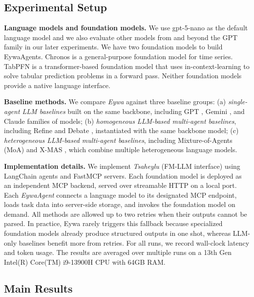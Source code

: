 \documentclass{llmxive}
\begin{document}
{\subsection{Experimental Setup}
\textbf{Language models and foundation models.} We use gpt-5-nano as the default language model and we also evaluate other models from and beyond the GPT family in our later experiments.
We have two foundation models to build EywaAgents. Chronos \cite{DBLP:journals/tmlr/AnsariSTZMSSRPK24, DBLP:journals/corr/abs-2510-15821} is a general-purpose foundation model for time series. 
TabPFN \cite{DBLP:conf/iclr/Hollmann0EH23} is a transformer-based foundation model that uses in-context-learning to solve tabular prediction problems in a forward pass.
Neither foundation models provide a native language interface.


\textbf{Baseline methods.} We compare \textit{Eywa} against three baseline groups: (a) \emph{single-agent LLM baselines} built on the same backbone, including GPT \cite{DBLP:journals/corr/abs-2601-03267}, Gemini \cite{team2023gemini, comanici2025gemini}, and Claude \cite{claude} families of models; (b) \emph{homogeneous LLM-based multi-agent baselines}, including Refine \cite{DBLP:conf/nips/MadaanTGHGW0DPY23} and Debate \cite{DBLP:conf/icml/Du00TM24}, instantiated with the same backbone model; (c) \emph{heterogeneous LLM-based multi-agent baselines}, including Mixture-of-Agents (MoA) \cite{DBLP:conf/iclr/WangWAZZ25} and X-MAS \cite{DBLP:journals/corr/abs-2505-16997}, which combine multiple heterogeneous language models.


\textbf{Implementation details.} We implement \textit{Tsaheylu} (FM-LLM interface) using LangChain agents and FastMCP servers.
Each foundation model is deployed as an independent MCP backend, served over streamable HTTP on a local port.
Each \textit{EywaAgent} connects a language model to its designated MCP endpoint, loads task data into server-side storage, and invokes the foundation model on demand.
All methods are allowed up to two retries when their outputs cannot be parsed. In practice, Eywa rarely triggers this fallback because specialized foundation models already produce structured outputs in one shot, whereas LLM-only baselines benefit more from retries.
For all runs, we record wall-clock latency and token usage. The results are averaged over multiple runs on a 13th Gen Intel(R) Core(TM) i9-13900H CPU with 64GB RAM. 

\subsection{Main Results}

}
\end{document}
